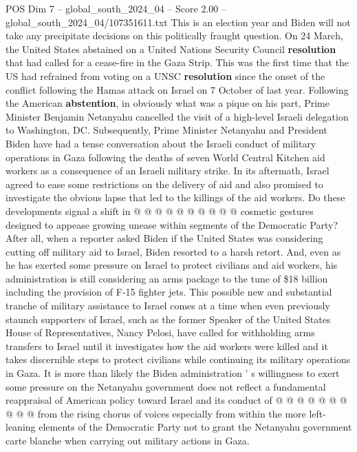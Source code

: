 \begin{textsample}{POS Dim 7 – global\_south\_2024\_04 – Score 2.00 – global\_south\_2024\_04/107351611.txt}  \label{ex:f7_pos_109}
This is an election year and Biden will not take any precipitate decisions on this politically fraught question.
On 24 March, the United States abstained on a United Nations Security Council \textbf{resolution} that had called for a cease-fire in the Gaza Strip.
This was the first time that the US had refrained from voting on a UNSC \textbf{resolution} since the onset of the conflict following the Hamas attack on Israel on 7 October of last year.
Following the American \textbf{abstention}, in obviously what was a pique on his part, Prime Minister Benjamin Netanyahu cancelled the visit of a high-level Israeli delegation to Washington, DC.
Subsequently, Prime Minister Netanyahu and President Biden have had a tense conversation about the Israeli conduct of military operations in Gaza following the deaths of seven World Central Kitchen aid workers as a consequence of an Israeli military strike.
In its aftermath, Israel agreed to ease some restrictions on the delivery of aid and also promised to investigate the obvious lapse that led to the killings of the aid workers.
Do these developments signal a shift in @ @ @ @ @ @ @ @ @ @ cosmetic gestures designed to appease growing unease within segments of the Democratic Party?
After all, when a reporter asked Biden if the United States was considering cutting off military aid to Israel, Biden resorted to a harsh retort.
And, even as he has exerted some pressure on Israel to protect civilians and aid workers, his administration is still considering an arms package to the tune of \$18 billion including the provision of F-15 fighter jets.
This possible new and substantial tranche of military assistance to Israel comes at a time when even previously staunch supporters of Israel, such as the former Speaker of the United States House of Representatives, Nancy Pelosi, have called for withholding arms transfers to Israel until it investigates how the aid workers were killed and it takes discernible steps to protect civilians while continuing its military operations in Gaza.
It is more than likely the Biden administration ' s willingness to exert some pressure on the Netanyahu government does not reflect a fundamental reappraisal of American policy toward Israel and its conduct of @ @ @ @ @ @ @ @ @ @ from the rising chorus of voices especially from within the more left-leaning elements of the Democratic Party not to grant the Netanyahu government carte blanche when carrying out military actions in Gaza.

\end{textsample}

